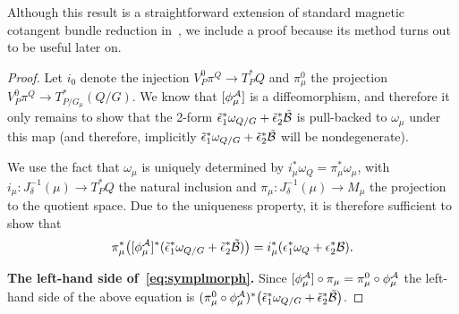 \documentclass[11pt]{article}
\newcommand{\A}{{\cal A}}
\newcommand{\B}{{\cal B}}
\newcommand{\e}{\epsilon}
\begin{document}
Although this result is a straightforward extension of standard magnetic cotangent bundle reduction in~\cite{MarsdenHamRed}, we include a proof because its method turns out to be useful later on.
\begin{proof}
Let $i_0$ denote the injection $V^0_P\pi^Q\to T^*_PQ$ and $\pi_\mu^0$ the projection $V^0_P\pi^Q\to T^*_{P/G_\mu}(Q/G)$. We know that $[\phi_\mu^\A]$ is a dif\/feomorphism, and therefore it only remains to show that the 2-form $\tilde\e_1^*\omega_{Q/G} + \tilde\e_2^*\tilde\B$ is pull-backed to $\omega_\mu$ under this map (and therefore, implicitly $\tilde\e_1^*\omega_{Q/G} + \tilde\e_2^*\tilde\B$ will be nondegenerate).

We use the fact that $\omega_\mu$ is uniquely determined by $i^*_\mu\omega_Q=\pi^*_\mu\omega_\mu$, with $i_\mu:J^{-1}_\delta(\mu)\to T_P^*Q$ the natural inclusion and $\pi_\mu:J^{-1}_\delta(\mu)\to M_\mu$ the projection to the quotient space. Due to the uniqueness property, it is therefore suf\/f\/icient to show that \begin{gather}\label{eq:symplmorph}
\pi^*_\mu\big([\phi_\mu^\A]^*(\tilde\e_1^*\omega_{Q/G} + \tilde\e_2^*\tilde\B)\big)=i^*_\mu(\e_1^*\omega_Q+\e^*_2\B).
\end{gather}

{\bf The left-hand side of~\eqref{eq:symplmorph}.} Since $[\phi_\mu^\A]\circ\pi_\mu = \pi^0_\mu\circ\phi_\mu^\A$ the left-hand side of the above equation is $(\pi^0_\mu\circ\phi_\mu^\A)^*\big(\tilde\e_1^*\omega_{Q/G} + \tilde\e_2^*\tilde\B\big)$.


\end{proof}
\end{document}
